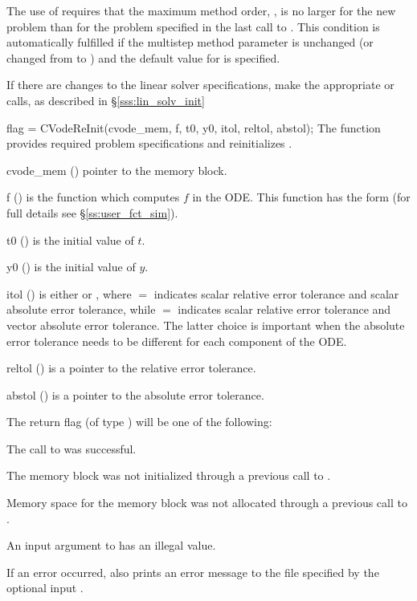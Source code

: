 The use of  requires that the maximum method order,    
, is no larger for the new problem than for the problem  
specified in the last call to .  This condition is  
automatically fulfilled if the multistep method parameter   
is unchanged (or changed from  to ) and the default    
value for  is specified.

If there are changes to the linear solver specifications, make the
appropriate  or  calls, as described in
\S\ref{sss:lin_solv_init}

{
  flag = CVodeReInit(cvode\_mem, f, t0, y0, itol, reltol, abstol);
}
{
  The function  provides required problem specifications 
  and reinitializes {\cvode}.
}
{
  \begin{args}
  \item[cvode\_mem] ()
    pointer to the {\cvode} memory block.
  \item[f] ()
    is the {\C} function which computes $f$ in the ODE. This function has the form 
     (for full details see \S\ref{ss:user_fct_sim}).
  \item[t0] ()
    is the initial value of $t$.
  \item[y0] ()
    is the initial value of $y$. 
  \item[itol] () 
    is either  or , where $=$ indicates
    scalar relative error tolerance and scalar absolute error tolerance, while
    $=$ indicates scalar relative error tolerance and vector
    absolute error tolerance.  The latter choice is important when the absolute
    error tolerance needs to be different for each component of the ODE. 
  \item[reltol] ()
    is a pointer to the relative error tolerance.
  \item[abstol] ()
    is a pointer to the absolute error tolerance.
  \end{args}
}
{
  The return flag  (of type ) will be one of the following:
  \begin{args}[CV\_NO\_MALLOC]
  \item[\Id{CV\_SUCCESS}]
    The call to  was successful.
  \item[\Id{CV\_MEM\_NULL}] 
    The {\cvode} memory block was not initialized through a 
    previous call to .
  \item[\Id{CV\_NO\_MALLOC}] 
    Memory space for the {\cvode} memory block was not allocated through a 
    previous call to .
  \item[\Id{CV\_ILL\_INPUT}] 
    An input argument to  has an illegal value.
  \end{args}
}
{
  If an error occurred,  also prints an error message to the
  file specified by the optional input .
}

